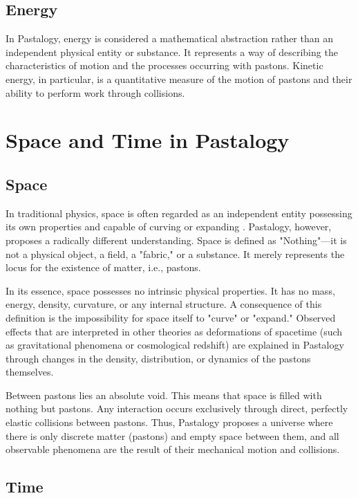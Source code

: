 \documentclass[pdflatex,sn-mathphys-num,referee]{sn-jnl}
\begin{document}
\subsection{Energy}\label{subsec:energy}

In Pastalogy, energy is considered a mathematical abstraction rather than an independent physical entity or substance. It represents a way of describing the characteristics of motion and the processes occurring with pastons. Kinetic energy, in particular, is a quantitative measure of the motion of pastons and their ability to perform work through collisions.

\section{Space and Time in Pastalogy}\label{sec:space-time}

\subsection{Space}\label{subsec:space}

In traditional physics, space is often regarded as an independent entity possessing its own properties and capable of curving or expanding \cite{mtw1973}. Pastalogy, however, proposes a radically different understanding. Space is defined as "Nothing"---it is not a physical object, a field, a "fabric," or a substance. It merely represents the locus for the existence of matter, i.e., pastons.

In its essence, space possesses no intrinsic physical properties. It has no mass, energy, density, curvature, or any internal structure. A consequence of this definition is the impossibility for space itself to "curve" or "expand." Observed effects that are interpreted in other theories as deformations of spacetime (such as gravitational phenomena or cosmological redshift) are explained in Pastalogy through changes in the density, distribution, or dynamics of the pastons themselves.

Between pastons lies an absolute void. This means that space is filled with nothing but pastons. Any interaction occurs exclusively through direct, perfectly elastic collisions between pastons. Thus, Pastalogy proposes a universe where there is only discrete matter (pastons) and empty space between them, and all observable phenomena are the result of their mechanical motion and collisions.

\subsection{Time}\label{subsec:time}
\end{document}
